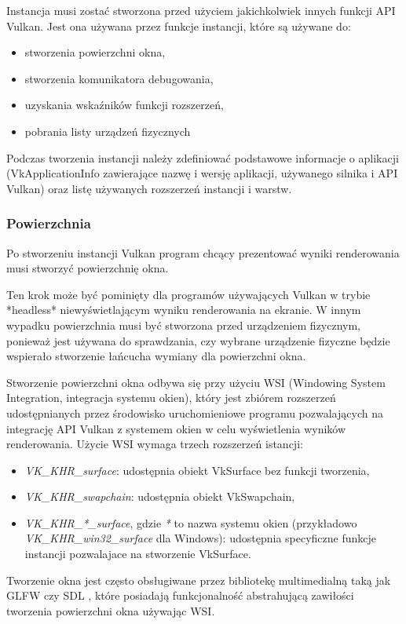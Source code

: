 Instancja musi zostać stworzona przed użyciem jakichkolwiek innych funkcji API Vulkan.
Jest ona używana przez funkcje instancji, które są używane do:
\begin{itemize}
	\item stworzenia powierzchni okna,
	\item stworzenia komunikatora debugowania,
	\item uzyskania wskaźników funkcji rozszerzeń,
	\item pobrania listy urządzeń fizycznych
\end{itemize}

Podczas tworzenia instancji należy zdefiniować podstawowe informacje o aplikacji (VkApplicationInfo zawierające nazwę i wersję aplikacji, używanego silnika i API Vulkan) oraz listę używanych rozszerzeń instancji i warstw.

\subsubsection{Powierzchnia}

Po stworzeniu instancji Vulkan program chcący prezentować wyniki renderowania musi stworzyć powierzchnię okna.

Ten krok może być pominięty dla programów używających Vulkan w trybie *headless* niewyświetlającym
wyniku renderowania na ekranie. W innym wypadku powierzchnia musi być stworzona przed urządzeniem fizycznym, ponieważ
jest używana do sprawdzania, czy wybrane urządzenie fizyczne będzie wspierało stworzenie łańcucha wymiany dla powierzchni okna.

Stworzenie powierzchni okna odbywa się przy użyciu WSI (Windowing System Integration, integracja systemu okien), który jest zbiórem rozszerzeń udostępnianych przez środowisko uruchomieniowe programu pozwalających na integrację API Vulkan z systemem okien w celu wyświetlenia wyników renderowania.
Użycie WSI wymaga trzech rozszerzeń istancji:
\begin{itemize}
	\item \textit{VK\_KHR\_surface}: udostępnia obiekt VkSurface bez funkcji tworzenia,
	\item \textit{VK\_KHR\_swapchain}: udostępnia obiekt VkSwapchain,
	\item \textit{VK\_KHR\_*\_surface}, gdzie \textit{*} to nazwa systemu okien (przykładowo \textit{VK\_KHR\_win32\_surface} dla Windows): udostępnia specyficzne funkcje instancji pozwalajace na stworzenie VkSurface.
\end{itemize}
Tworzenie okna jest często obsługiwane przez bibliotekę multimedialną taką jak GLFW \cite{GLFW} czy SDL \cite{SDL}, które posiadają funkcjonalność abstrahującą zawiłości tworzenia powierzchni okna używając WSI.

